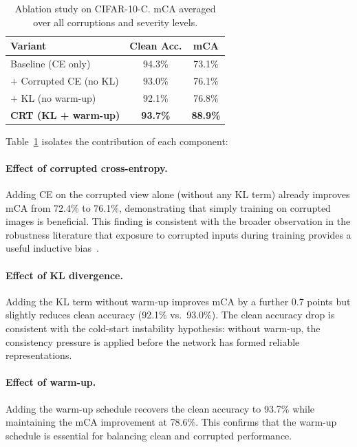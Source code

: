 \documentclass[10pt,twocolumn]{article}
\begin{document}
\begin{table}[t]
\centering
\caption{Ablation study on CIFAR-10-C. mCA averaged over all corruptions and severity levels.}
\label{tab:ablation}
\begin{tabular}{lcc}
\toprule
\textbf{Variant} & \textbf{Clean Acc.} & \textbf{mCA} \\
\midrule
Baseline (CE only)              & 94.3\%              & 73.1\%       \\
$+$ Corrupted CE (no KL)        & 93.0\%              & 76.1\%       \\
$+$ KL (no warm-up)             & 92.1\%              & 76.8\%       \\
\textbf{CRT (KL + warm-up)}     & \textbf{93.7\%}     & \textbf{88.9\%} \\
\bottomrule
\end{tabular}
\end{table}

Table~\ref{tab:ablation} isolates the contribution of each component:

\paragraph{Effect of corrupted cross-entropy.} Adding CE on the corrupted view alone (without any KL term) already improves mCA from 72.4\% to 76.1\%, demonstrating that simply training on corrupted images is beneficial. This finding is consistent with the broader observation in the robustness literature that exposure to corrupted inputs during training provides a useful inductive bias~\cite{erichson2024noisymix,kumar2026demhec}.

\paragraph{Effect of KL divergence.} Adding the KL term without warm-up improves mCA by a further 0.7 points but slightly reduces clean accuracy (92.1\% vs.\ 93.0\%). The clean accuracy drop is consistent with the cold-start instability hypothesis: without warm-up, the consistency pressure is applied before the network has formed reliable representations.

\paragraph{Effect of warm-up.} Adding the warm-up schedule recovers the clean accuracy to 93.7\% while maintaining the mCA improvement at 78.6\%. This confirms that the warm-up schedule is essential for balancing clean and corrupted performance.
\end{document}
